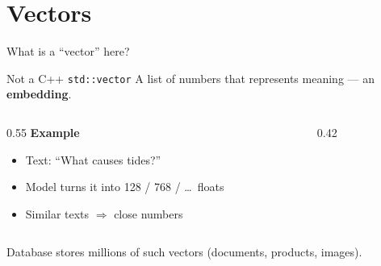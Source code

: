 \documentclass[aspectratio=169,11pt]{beamer}
\begin{document}
\section{Vectors}
\begin{frame}{What is a ``vector'' here?}
  \begin{block}{Not a C++ \texttt{std::vector}}
    A list of numbers that represents meaning --- an \textbf{embedding}.
  \end{block}

  \vspace{0.6em}
  \begin{columns}[T]
    \begin{column}{0.55\textwidth}
      \textbf{Example}
      \begin{itemize}
        \item Text: ``What causes tides?''
        \item Model turns it into 128 / 768 / \ldots\ floats
        \item Similar texts $\Rightarrow$ close numbers
      \end{itemize}
    \end{column}
    \begin{column}{0.42\textwidth}
      \centering
    \end{column}
  \end{columns}

  \vspace{0.5em}
  {\footnotesize Database stores millions of such vectors (documents, products, images).}
\end{frame}
\end{document}
